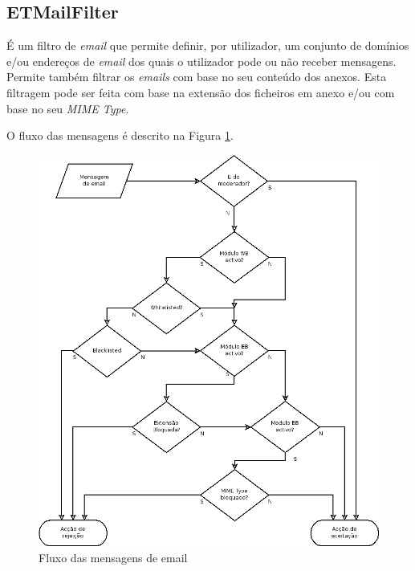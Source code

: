 \subsection{ETMailFilter}

É um filtro de \emph{email} que permite definir, por utilizador, um conjunto de domínios e/ou endereços de \emph{email} dos quais o utilizador pode ou não receber mensagens.
Permite também filtrar os \emph{emails} com base no seu conteúdo dos anexos. Esta filtragem pode ser feita com base na extensão dos ficheiros em anexo e/ou com base no seu \emph{MIME Type}.

O fluxo das mensagens é descrito na Figura \ref{fig:etmf}.

\begin{figure}[p]
\centering
\includegraphics[width=\textwidth]{include/img/etmf}
\caption{Fluxo das mensagens de email}
\label{fig:etmf}
\end{figure}

